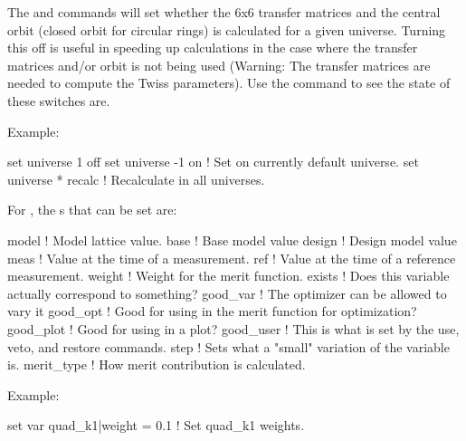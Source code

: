 {{\begin{description}
The  and  commands will set whether the 6x6
transfer matrices and the central orbit (closed orbit for circular
rings) is calculated for a given universe. Turning this off is useful
in speeding up calculations in the case where the transfer matrices and/or orbit
is not being used (Warning: The transfer matrices are needed to
compute the Twiss parameters). Use the  command to
see the state of these switches are.

Example:
\begin{example}
  set universe 1 off
  set universe -1 on    ! Set on currently default universe.
  set universe * recalc ! Recalculate in all universes.
\end{example}


\item[set var <var\_name>|<component> = <value>] \Newline

\vskip -0.2in

For , the s that can be set are:
\begin{example}
  model       ! Model lattice value.
  base        ! Base model value
  design      ! Design model value
  meas        ! Value at the time of a measurement.
  ref         ! Value at the time of a reference measurement.
  weight      ! Weight for the merit function.
  exists      ! Does this variable actually correspond to something?
  good_var    ! The optimizer can be allowed to vary it
  good_opt    ! Good for using in the merit function for optimization?
  good_plot   ! Good for using in a plot?
  good_user   ! This is what is set by the use, veto, and restore commands.
  step        ! Sets what a "small" variation of the variable is.
  merit_type  ! How merit contribution is calculated.
\end{example}

Example:
\begin{example}
  set var quad\_k1|weight = 0.1         ! Set quad\_k1 weights. 
\end{example}


\item[set wave <component> = <value>] \Newline

\vskip -0.2in


\end{description}}}
